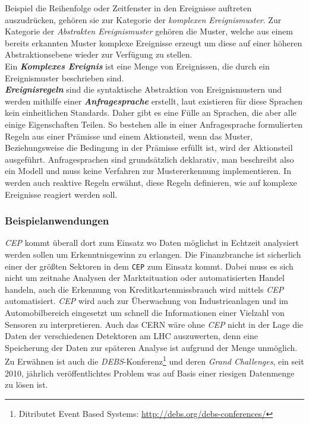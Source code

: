 \documentclass{acm_proc_article-sp}
\begin{document}
Beispiel die Reihenfolge oder Zeitfenster in den Ereignisse auftreten auszudrücken, 
gehören sie zur Kategorie der \textit{komplexen Ereignismuster}. Zur Kategorie der 
\textit{Abstrakten Ereignismuster} gehören die Muster, welche aus einem bereits erkannten 
Muster komplexe Ereignisse erzeugt um diese auf einer höheren Abstraktionsebene wieder 
zur Verfügung zu stellen.\\
Ein \textbf{\textit{Komplexes Ereignis}} ist eine Menge von Ereignissen, die durch ein 
Ereignismuster beschrieben sind.\\\label{begriff-ereignisregel}
\textbf{\textit{Ereignisregeln}} sind die syntaktische Abstraktion von Ereignismustern 
und werden mithilfe einer \textbf{\textit{Anfragesprache}} erstellt, laut \cite{bruns} 
existieren für diese 
Sprachen kein einheitlichen Standards. Daher gibt es eine Fülle an Sprachen, die aber 
alle einige Eigenschaften Teilen. So bestehen alle in einer Anfragesprache formulierten 
Regeln aus einer Prämisse und einem Aktionsteil, wenn das Muster, Beziehungsweise die 
Bedingung in der Prämisse erfüllt ist, wird der Aktionsteil ausgeführt. Anfragesprachen 
sind grundsätzlich deklarativ, man beschreibt also ein Modell und muss keine Verfahren 
zur Mustererkennung implementieren. In \cite{eckert} werden auch reaktive Regeln erwähnt, 
diese Regeln definieren, wie auf komplexe Ereignisse reagiert werden soll.

\subsubsection{Beispielanwendungen}
\vspace{0.1cm}

\textit{CEP} kommt überall dort zum Einsatz wo Daten möglichst in Echtzeit analysiert 
werden sollen um Erkenntnisgewinn zu erlangen. Die Finanzbranche ist sicherlich einer der 
größten Sektoren in dem \texttt{CEP} zum Einsatz kommt. Dabei muss es sich nicht um 
zeitnahe Analysen der Marktsituation oder automatisierten Handel handeln, auch die 
Erkennung von 
Kreditkartenmissbrauch wird mittels \textit{CEP} automatisiert. \textit{CEP} wird auch 
zur Überwachung von Industrieanlagen und im Automobilbereich eingesetzt um schnell die 
Informationen einer Vielzahl von Sensoren zu interpretieren. Auch das CERN wäre ohne 
\textit{CEP} nicht in der Lage die Daten der verschiedenen Detektoren am LHC auszuwerten, 
denn eine Speicherung der Daten zur späteren Analyse ist aufgrund der Menge unmöglich.\\
Zu Erwähnen ist auch die \textit{DEBS}-Konferenz\footnote{Ditributet Event Based Systems: 
\url{http://debs.org/debs-conferences/}} und deren \textit{Grand Challenges}, ein seit 
2010, jährlich veröffentlichtes Problem was auf Basis einer riesigen Datenmenge zu lösen 
ist.
\end{document}

